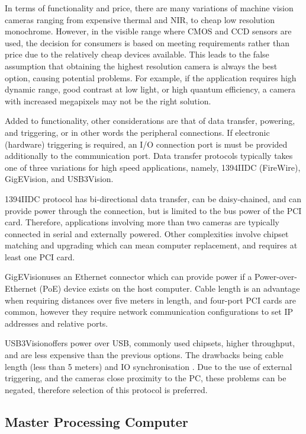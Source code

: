 \documentclass[fleqn,twoside,12pt]{report}
\begin{document}
In terms of functionality and price, there are many variations of machine vision cameras ranging from expensive thermal and NIR, to cheap low resolution monochrome. However, in the visible range where CMOS and CCD sensors are used, the decision for consumers is based on meeting requirements rather than price due to the relatively cheap devices available. This leads to the false assumption that obtaining the highest resolution camera is always the best option, causing potential problems. For example, if the application requires high dynamic range, good contrast at low light, or high quantum efficiency, a camera with increased megapixels may not be the right solution.

Added to functionality, other considerations are that of data transfer, powering, and triggering, or in other words the peripheral connections. If electronic (hardware) triggering is required, an I/O connection port is must be provided additionally to the communication port. Data transfer protocols typically takes one of three variations for high speed applications, namely, 1394IIDC (FireWire\texttrademark), GigEVision\textregistered, and USB3Vision\textregistered. 

1394IIDC protocol has bi-directional data transfer, can be daisy-chained, and can provide power through the connection, but is limited to the bus power of the PCI card. Therefore, applications involving more than two cameras are typically connected in serial and externally powered. Other complexities involve chipset matching and upgrading which can mean computer replacement, and requires at least one PCI card. 

GigEVision\textregistered uses an Ethernet connector which can provide power if a Power-over-Ethernet (PoE) device exists on the host computer. Cable length is an advantage when requiring distances over five meters in length, and four-port PCI cards are common, however they require network communication configurations to set IP addresses and relative ports.

USB3Vision\textregistered offers power over USB, commonly used chipsets, higher throughput, and are less expensive than the previous options. The drawbacks being cable length (less than 5 meters) and IO synchronisation \cite{camera_bus}. Due to the use of external triggering, and the cameras close proximity to the PC, these problems can be negated, therefore selection of this protocol is preferred.




\subsection{Master Processing Computer}
\end{document}

